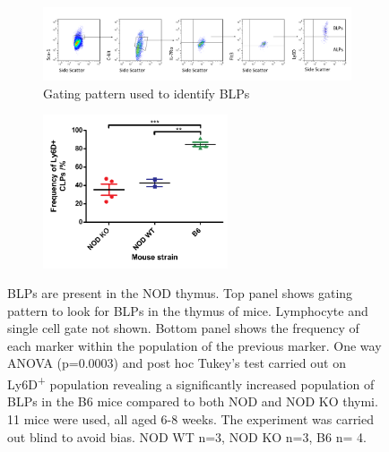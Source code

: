 \begin{figure}
	\begin{subfigure}{\textwidth}
	\includegraphics[width=\textwidth]{Figures/BLPgating.png}
	\caption{Gating pattern used to identify BLPs}
	\label{subfig:BLPgating}
	\end{subfigure}
	\begin{subfigure}{\textwidth}
	\centering
	\includegraphics[width=0.6\textwidth]{Figures/Ly6D.pdf}
	\caption{}
	\label{subfig:BLPgraph}
	\end{subfigure}
\caption[BLPs are significantly decreased in the NOD thymus compared to the B6 thymus]{BLPs are present in the NOD thymus. 
Top panel shows gating pattern to look for BLPs in the thymus of mice. Lymphocyte and single cell gate not shown.
Bottom panel shows the frequency of each marker within the population of the previous marker.
One way ANOVA (p=0.0003) and post hoc Tukey's test carried out on Ly6D\textsuperscript{+} population revealing a significantly increased population of BLPs in the B6 mice compared to both NOD and NOD KO thymi.
11 mice were used, all aged 6-8 weeks. 
The experiment was carried out blind to avoid bias. 
NOD WT n=3, NOD KO n=3, B6 n= 4.}
\label{fig:BLPs}
\end{figure}


